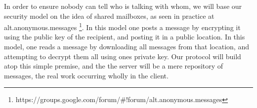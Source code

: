 In order to ensure nobody can tell who is talking with whom, we will base our
security model on the idea of shared mailboxes, as seen in practice at
alt.anonymous.messages
\footnote{https://groups.google.com/forum/\#!forum/alt.anonymous.messages}.
In this model one posts a message by encrypting it using the public key of the
recipient, and posting it in a public location. In this model, one reads a
message by downloading all messages from that location, and attempting to
decrypt them all using ones private key. Our protocol will build atop this
simple premise, and the the server will be a mere repository of messages, the
real work occurring wholly in the client.
